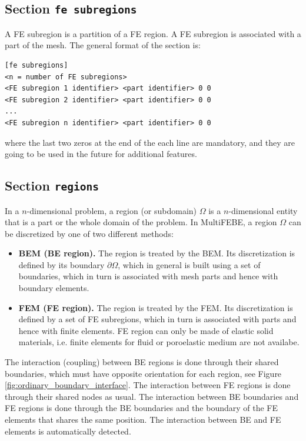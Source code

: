 \documentclass[a4paper,fleqn]{book}
\begin{document}
\subsection{Section \texttt{fe subregions}}
A FE subregion is a partition of a FE region. A FE subregion is associated with a part of the mesh. The general format of the section is:
\begin{Verbatim}[frame=single, fontsize=\small, label={general format of section [fe subregions]}]
[fe subregions]
<n = number of FE subregions>
<FE subregion 1 identifier> <part identifier> 0 0
<FE subregion 2 identifier> <part identifier> 0 0
...
<FE subregion n identifier> <part identifier> 0 0
\end{Verbatim}
where the last two zeros at the end of the each line are mandatory, and they are going to be used in the future for additional features.

\subsection{Section \texttt{regions}}
In a $n$-dimensional problem, a region (or subdomain) $\Omega$ is a $n$-dimensional entity that is a part or the whole domain of the problem. In MultiFEBE, a region $\Omega$ can be discretized by one of two different methods:
\begin{itemize}
  \item \textbf{BEM (BE region).} The region is treated by the BEM. Its discretization is defined by its boundary $\partial\Omega$, which in general is built using a set of boundaries, which in turn is associated with mesh parts and hence with boundary elements.
  \item \textbf{FEM (FE region).} The region is treated by the FEM. Its discretization is defined by a set of FE subregions, which in turn is associated with parts and hence with finite elements. FE region can only be made of elastic solid materials, i.e. finite elements for fluid or poroelastic medium are not availabe.
\end{itemize}
The interaction (coupling) between BE regions is done through their shared boundaries, which must have opposite orientation for each region, see Figure \ref{fig:ordinary_boundary_interface}. The interaction between FE regions is done through their shared nodes as usual. The interaction between BE boundaries and FE regions is done through the BE boundaries and the boundary of the FE elements that shares the same position. The interaction between BE and FE elements is automatically detected.
\end{document}
